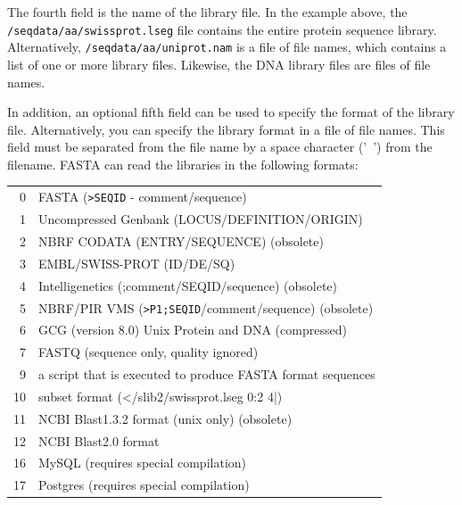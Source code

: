 \documentclass[11pt]{article}
\begin{document}
The fourth field is the name of the library file.  In the example
above, the \texttt{/seqdata/aa/swissprot.lseg} file contains the
entire protein sequence library.  Alternatively,
\texttt{/seqdata/aa/uniprot.nam} is a file of file names, which
contains a list of one or more library files.  Likewise, the DNA
library files are files of file names.

In addition, an optional fifth field can be used to specify the format
of the library file.  Alternatively, you can specify the library
format in a file of file names.  This field must be separated from the
file name by a space character ('\ ') from the filename.  FASTA can
read the libraries in the following formats:\\

\begin{tabular}{r l}
0 & FASTA (\texttt{>SEQID} - comment/sequence) \\
1 & Uncompressed Genbank (LOCUS/DEFINITION/ORIGIN)\\
2 & NBRF CODATA (ENTRY/SEQUENCE) (obsolete)\\
3 & EMBL/SWISS-PROT (ID/DE/SQ)\\
4 & Intelligenetics (;comment/SEQID/sequence) (obsolete)\\
5 & NBRF/PIR VMS (\texttt{>P1;SEQID}/comment/sequence) (obsolete)\\
6 & GCG (version 8.0) Unix Protein and DNA (compressed)\\
7 & FASTQ (sequence only, quality ignored)\\
9 & a script that is executed to produce FASTA format sequences \\ 
10 & subset format (</slib2/swissprot.lseg 0:2 4|) \\
11 & NCBI Blast1.3.2 format  (unix only) (obsolete)\\
12 & NCBI Blast2.0 format\\
16 & MySQL (requires special compilation) \\
17 & Postgres (requires special compilation) \\
\end{tabular}
\end{document}
